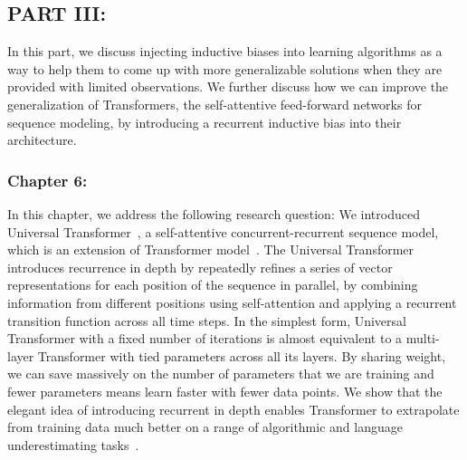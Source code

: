 \subsection*{PART III: }
In this part, we discuss injecting inductive biases into learning algorithms as a way to help them to come up with more generalizable solutions when they are provided with limited observations. We further discuss how we can improve the generalization of Transformers, the self-attentive feed-forward networks for sequence modeling, by introducing a recurrent inductive bias into their architecture.

\subsubsection*{Chapter 6: }
In this chapter, we address the following research question:
We introduced Universal Transformer~\citep{Dehghani:ICLR:2019}, a self-attentive concurrent-recurrent sequence model, which is an extension of Transformer model~\citep{vaswani2017attention}. The Universal Transformer introduces recurrence in depth by repeatedly refines a series of vector representations for each position of the sequence in parallel, by combining information from different positions using self-attention and applying a recurrent transition function across all time steps. 
In the simplest form, Universal Transformer with a fixed number of iterations is almost equivalent to a multi-layer Transformer with tied parameters across all its layers. By sharing weight, we can save massively on the number of parameters that we are training and fewer parameters means learn faster with fewer data points.  We show that the elegant idea of introducing recurrent in depth enables Transformer to extrapolate from training data much better on a range of algorithmic and language underestimating tasks~\citep{Dehghani:ICLR:2019, Dehghani:2019:WSDM}.



